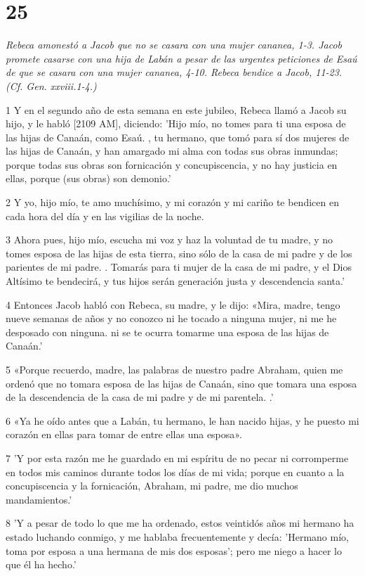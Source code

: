 \chapter{25}

\par \textit{Rebeca amonestó a Jacob que no se casara con una mujer cananea, 1-3. Jacob promete casarse con una hija de Labán a pesar de las urgentes peticiones de Esaú de que se casara con una mujer cananea, 4-10. Rebeca bendice a Jacob, 11-23. (Cf. Gen. xxviii.1-4.)}

\par 1 Y en el segundo año de esta semana en este jubileo, Rebeca llamó a Jacob su hijo, y le habló [2109 AM], diciendo: 'Hijo mío, no tomes para ti una esposa de las hijas de Canaán, como Esaú. , tu hermano, que tomó para sí dos mujeres de las hijas de Canaán, y han amargado mi alma con todas sus obras inmundas; porque todas sus obras son fornicación y concupiscencia, y no hay justicia en ellas, porque (sus obras) son demonio.'
\par 2 Y yo, hijo mío, te amo muchísimo, y mi corazón y mi cariño te bendicen en cada hora del día y en las vigilias de la noche.
\par 3 Ahora pues, hijo mío, escucha mi voz y haz la voluntad de tu madre, y no tomes esposa de las hijas de esta tierra, sino sólo de la casa de mi padre y de los parientes de mi padre. . Tomarás para ti mujer de la casa de mi padre, y el Dios Altísimo te bendecirá, y tus hijos serán generación justa y descendencia santa.'
\par 4 Entonces Jacob habló con Rebeca, su madre, y le dijo: «Mira, madre, tengo nueve semanas de años y no conozco ni he tocado a ninguna mujer, ni me he desposado con ninguna. ni se te ocurra tomarme una esposa de las hijas de Canaán.'
\par 5 «Porque recuerdo, madre, las palabras de nuestro padre Abraham, quien me ordenó que no tomara esposa de las hijas de Canaán, sino que tomara una esposa de la descendencia de la casa de mi padre y de mi parentela. .'
\par 6 «Ya he oído antes que a Labán, tu hermano, le han nacido hijas, y he puesto mi corazón en ellas para tomar de entre ellas una esposa».
\par 7 'Y por esta razón me he guardado en mi espíritu de no pecar ni corromperme en todos mis caminos durante todos los días de mi vida; porque en cuanto a la concupiscencia y la fornicación, Abraham, mi padre, me dio muchos mandamientos.'
\par 8 'Y a pesar de todo lo que me ha ordenado, estos veintidós años mi hermano ha estado luchando conmigo, y me hablaba frecuentemente y decía: 'Hermano mío, toma por esposa a una hermana de mis dos esposas'; pero me niego a hacer lo que él ha hecho.'
